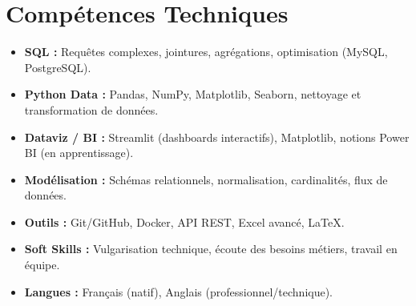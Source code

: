 \documentclass[a4paper,11pt]{article}
\begin{document}
\section{Compétences Techniques}
\begin{itemize}[leftmargin=*, nosep]
    \item \small{\textbf{SQL :} Requêtes complexes, jointures, agrégations, optimisation (MySQL, PostgreSQL).}
    \item \small{\textbf{Python Data :} Pandas, NumPy, Matplotlib, Seaborn, nettoyage et transformation de données.}
    \item \small{\textbf{Dataviz / BI :} Streamlit (dashboards interactifs), Matplotlib, notions Power BI (en apprentissage).}
    \item \small{\textbf{Modélisation :} Schémas relationnels, normalisation, cardinalités, flux de données.}
    \item \small{\textbf{Outils :} Git/GitHub, Docker, API REST, Excel avancé, LaTeX.}
    \item \small{\textbf{Soft Skills :} Vulgarisation technique, écoute des besoins métiers, travail en équipe.}
    \item \small{\textbf{Langues :} Français (natif), Anglais (professionnel/technique).}
\end{itemize}

\end{document}
